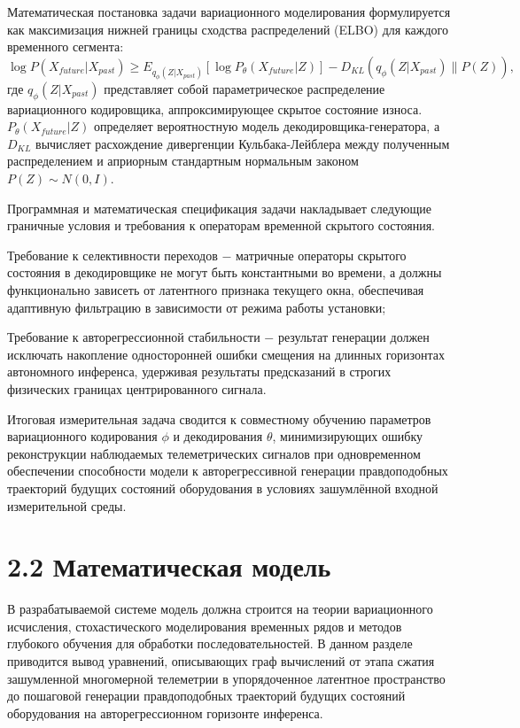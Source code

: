 \documentclass[14pt, a4paper, oneside]{extreport}
\begin{document}
Математическая постановка задачи вариационного моделирования формулируется как максимизация нижней границы сходства распределений (ELBO) для каждого временного сегмента:
\begin{equation}
\log P(X_{future} | X_{past}) \geq E_{q_\phi(Z|X_{past})} [\log P_\theta(X_{future} | Z)] - D_{KL}(q_\phi(Z|X_{past}) \parallel P(Z)),
\end{equation}
где $q_\phi(Z|X_{past})$ представляет собой параметрическое распределение вариационного кодировщика, аппроксимирующее скрытое состояние износа. $P_\theta(X_{future} | Z)$ определяет вероятностную модель декодировщика-генератора, а $D_{KL}$ вычисляет расхождение дивергенции Кульбака-Лейблера между полученным распределением и априорным стандартным нормальным законом $P(Z) \sim N(0, I)$.

Программная и математическая спецификация задачи накладывает следующие граничные условия и требования к операторам временной скрытого состояния.

Требование к селективности переходов $-$ матричные операторы скрытого состояния в декодировщике не могут быть константными во времени, а должны функционально зависеть от латентного признака текущего окна, обеспечивая адаптивную фильтрацию в зависимости от режима работы установки;

Требование к авторегрессионной стабильности $-$ результат генерации должен исключать накопление односторонней ошибки смещения на длинных горизонтах автономного инференса, удерживая результаты предсказаний в строгих физических границах центрированного сигнала.

Итоговая измерительная задача сводится к совместному обучению параметров 
вариационного кодирования $\phi$ и декодирования $\theta$, минимизирующих 
ошибку реконструкции наблюдаемых телеметрических сигналов при одновременном 
обеспечении способности модели к авторегрессивной генерации правдоподобных 
траекторий будущих состояний оборудования в условиях зашумлённой входной 
измерительной среды.
\vspace{1em}
\section{2.2 Математическая модель}
\vspace{1em}
В разрабатываемой системе модель должна строится на теории вариационного исчисления, стохастического моделирования временных рядов и методов глубокого обучения для обработки последовательностей. В данном разделе приводится вывод уравнений, описывающих граф вычислений от этапа сжатия зашумленной многомерной телеметрии в упорядоченное латентное пространство до пошаговой генерации правдоподобных траекторий будущих состояний оборудования на авторегрессионном горизонте инференса.
\end{document}
